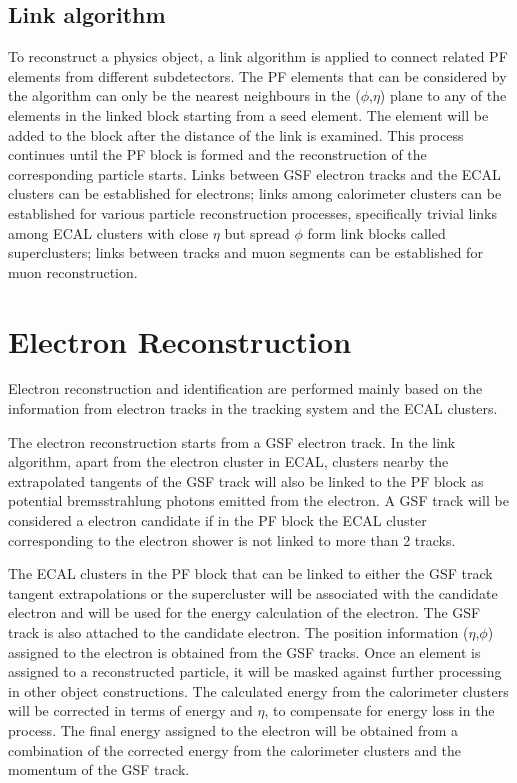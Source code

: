 \subsection{Link algorithm}
To reconstruct a physics object, a link algorithm is applied to connect related PF elements from different subdetectors. The PF elements that can be considered by the algorithm can only be the nearest neighbours in the ($\phi$,$\eta$) plane to any of the elements in the linked block starting from a seed element. The element will be added to the block after the distance of the link is examined. This process continues until the PF block is formed and the reconstruction of the corresponding particle starts. Links between GSF electron tracks and the ECAL clusters can be established for electrons; links among calorimeter clusters can be established for various particle reconstruction processes, specifically trivial links among ECAL clusters with close $\eta$ but spread $\phi$ form link blocks called superclusters; links between tracks and muon segments can be established for muon reconstruction.

\section{Electron Reconstruction}
Electron reconstruction and identification are performed mainly based on the information from electron tracks in the tracking system and the ECAL clusters. ~\cite{ob_electronconst2}

\vspace{0.3cm}
The electron reconstruction starts from a GSF electron track. In the link algorithm, apart from the electron cluster in ECAL, clusters nearby the extrapolated tangents of the GSF track will also be linked to the PF block as potential bremsstrahlung photons emitted from the electron. A GSF track will be considered a electron candidate if in the PF block the ECAL cluster corresponding to the electron shower is not linked to more than 2 tracks. 

\vspace{0.3cm}
The ECAL clusters in the PF block that can be linked to either the GSF track tangent extrapolations or the supercluster will be associated with the candidate electron and will be used for the energy calculation of the electron. The GSF track is also attached to the candidate electron. The position information ($\eta$,$\phi$) assigned to the electron is obtained from the GSF tracks. Once an element is assigned to a reconstructed particle, it will be masked against further processing in other object constructions. The calculated energy from the calorimeter clusters will be corrected in terms of energy and $\eta$, to compensate for energy loss in the process. The final energy assigned to the electron will be obtained from a combination of the corrected energy from the calorimeter clusters and the momentum of the GSF track. 

